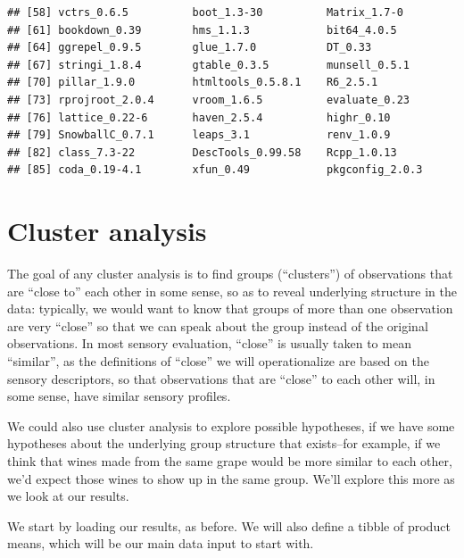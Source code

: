 \documentclass[
]{book}
\begin{document}
\begin{verbatim}
## [58] vctrs_0.6.5          boot_1.3-30          Matrix_1.7-0        
## [61] bookdown_0.39        hms_1.1.3            bit64_4.0.5         
## [64] ggrepel_0.9.5        glue_1.7.0           DT_0.33             
## [67] stringi_1.8.4        gtable_0.3.5         munsell_0.5.1       
## [70] pillar_1.9.0         htmltools_0.5.8.1    R6_2.5.1            
## [73] rprojroot_2.0.4      vroom_1.6.5          evaluate_0.23       
## [76] lattice_0.22-6       haven_2.5.4          highr_0.10          
## [79] SnowballC_0.7.1      leaps_3.1            renv_1.0.9          
## [82] class_7.3-22         DescTools_0.99.58    Rcpp_1.0.13         
## [85] coda_0.19-4.1        xfun_0.49            pkgconfig_2.0.3
\end{verbatim}

\chapter{Cluster analysis}\label{cluster-analysis}

The goal of any cluster analysis is to find groups (``clusters'') of observations that are ``close to'' each other in some sense, so as to reveal underlying structure in the data: typically, we would want to know that groups of more than one observation are very ``close'' so that we can speak about the group instead of the original observations. In most sensory evaluation, ``close'' is usually taken to mean ``similar'', as the definitions of ``close'' we will operationalize are based on the sensory descriptors, so that observations that are ``close'' to each other will, in some sense, have similar sensory profiles.

We could also use cluster analysis to explore possible hypotheses, if we have some hypotheses about the underlying group structure that exists--for example, if we think that wines made from the same grape would be more similar to each other, we'd expect those wines to show up in the same group. We'll explore this more as we look at our results.

We start by loading our results, as before. We will also define a tibble of product means, which will be our main data input to start with.
\end{document}

